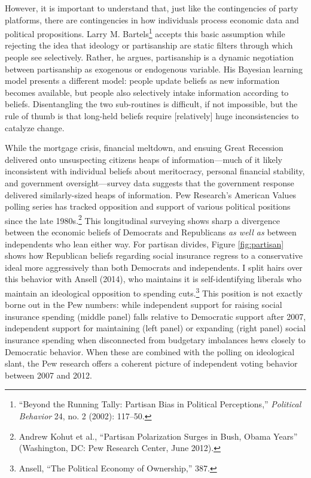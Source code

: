 \documentclass[12pt,oneside]{psthesis}
\begin{document}
However, it is important to understand that, just like the contingencies of party platforms, there are contingencies in how individuals process economic data and political propositions.
Larry M. Bartels\footnote{``Beyond the Running Tally: Partisan Bias in Political Perceptions,'' \emph{Political Behavior} 24, no. 2 (2002): 117--50.} accepts this basic assumption while rejecting the idea that ideology or partisanship are static filters through which people see selectively.
Rather, he argues, partisanship is a dynamic negotiation between partisanship as exogenous or endogenous variable.
His Bayesian learning model presents a different model: people update beliefs as new information becomes available, but people also selectively intake information according to beliefs.
Disentangling the two sub-routines is difficult, if not impossible, but the rule of thumb is that long-held beliefs require {[}relatively{]} huge inconsistencies to catalyze change.

While the mortgage crisis, financial meltdown, and ensuing Great Recession delivered onto unsuspecting citizens heaps of information---much of it likely inconsistent with individual beliefs about meritocracy, personal financial stability, and government oversight---survey data suggests that the government response delivered similarly-sized heaps of information.
Pew Research's American Values polling series has tracked opposition and support of various political positions since the late 1980s.\footnote{Andrew Kohut et al., ``Partisan Polarization Surges in Bush, Obama Years'' (Washington, DC: Pew Research Center, June 2012).}
This longitudinal surveying shows sharp a divergence between the economic beliefs of Democrats and Republicans \emph{as well as} between independents who lean either way.
For partisan divides, Figure \ref{fig:partisan} shows how Republican beliefs regarding social insurance regress to a conservative ideal more aggressively than both Democrats and independents.
I split hairs over this behavior with Ansell (2014), who maintains it is self-identifying liberals who maintain an ideological opposition to spending cuts.\footnote{Ansell, ``The Political Economy of Ownership,'' 387.}
This position is not exactly borne out in the Pew numbers: while independent support for raising social insurance spending (middle panel) falls relative to Democratic support after 2007, independent support for maintaining (left panel) or expanding (right panel) social insurance spending when disconnected from budgetary imbalances hews closely to Democratic behavior.
When these are combined with the polling on ideological slant, the Pew research offers a coherent picture of independent voting behavior between 2007 and 2012.
\end{document}
